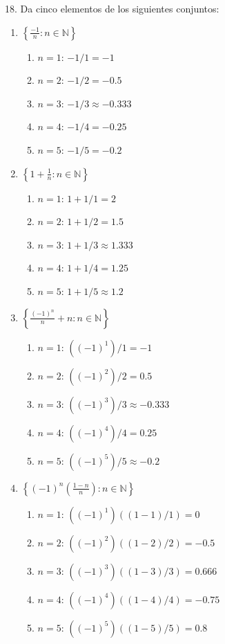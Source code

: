 \documentclass{article}
\begin{document}
18. Da cinco elementos de los siguientes conjuntos:
    \begin{enumerate}
      \item \(\left\{\frac{-1}{n} : n\in\mathbb{N}\right\}\)
      \begin{enumerate}
\item $n=1$: $-1/1 = -1$
\item $n=2$: $-1/2 = -0.5$
\item $n=3$: $-1/3 \approx -0.333$
\item $n=4$: $-1/4 = -0.25$
\item $n=5$: $-1/5 = -0.2$\\
\end{enumerate}
      \item \(\left\{1+\frac{1}{n} : n\in\mathbb{N}\right\}\)
      \begin{enumerate}
\item $n=1$: $1 + 1/1 = 2$
\item $n=2$: $1 + 1/2 = 1.5$
\item $n=3$: $1 + 1/3 \approx 1.333$
\item $n=4$: $1 + 1/4 = 1.25$
\item $n=5$: $1 + 1/5 \approx 1.2$\\
\end{enumerate}
      \item \(\left\{\frac{(-1)^n}{n}+n : n\in\mathbb{N}\right\}\)
      \begin{enumerate}
\item $n=1$: $((-1)^1)/1 = -1$
\item $n=2$: $((-1)^2)/2 = 0.5$
\item $n=3$: $((-1)^3)/3 \approx -0.333$
\item $n=4$: $((-1)^4)/4 = 0.25$
\item $n=5$: $((-1)^5)/5 \approx -0.2$\\
\end{enumerate}
      \item \(\left\{(-1)^n\left(\frac{1-n}{n}\right) : n\in\mathbb{N}\right\}\)
      \begin{enumerate}
\item $n=1$: $((-1)^1)((1-1)/1) = 0$
\item $n=2$: $((-1)^2)((1-2)/2) = -0.5$
\item $n=3$: $((-1)^3)((1-3)/3) = 0.666$
\item $n=4$: $((-1)^4)((1-4)/4) = -0.75$
\item $n=5$: $((-1)^5)((1-5)/5) = 0.8$\\

\end{enumerate}
\end{enumerate}
\end{document}
